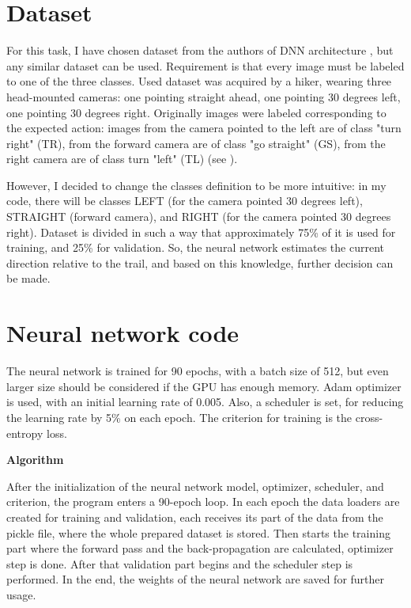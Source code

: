 \section{Dataset}

For this task, I have chosen dataset from the authors of DNN architecture \cite{giusti2016machine}, but any similar dataset can be used. Requirement is that every image must be labeled to one of the three classes. Used dataset was acquired by a hiker, wearing three head-mounted cameras: one pointing straight ahead, one pointing 30 degrees left, one pointing 30 degrees right. Originally images were labeled corresponding to the expected action: images from the camera pointed to the left are of class "turn right" (TR), from the forward camera are of class "go straight" (GS), from the right camera are of class turn "left" (TL) (see ).

However, I decided to change the classes definition to be more intuitive: in my code, there will be classes LEFT (for the camera pointed 30 degrees left), STRAIGHT (forward camera), and RIGHT (for the camera pointed 30 degrees right). Dataset is divided in such a way that approximately 75\% of it is used for training, and 25\% for validation. So, the neural network estimates the current direction relative to the trail, and based on this knowledge, further decision can be made.

\section{Neural network code}

The neural network is trained for 90 epochs, with a batch size of 512, but even larger size should be considered if the GPU has enough memory. Adam optimizer is used, with an initial learning rate of 0.005. Also, a scheduler is set, for reducing the learning rate by 5\% on each epoch. The criterion for training is the cross-entropy loss. 

\textbf{Algorithm}

After the initialization of the neural network model, optimizer, scheduler, and criterion, the program enters a 90-epoch loop. In each epoch the data loaders are created for training and validation, each receives its part of the data from the pickle file, where the whole prepared dataset is stored. Then starts the training part where the forward pass and the back-propagation are calculated, optimizer step is done. After that validation part begins and the scheduler step is performed. In the end, the weights of the neural network are saved for further usage.

